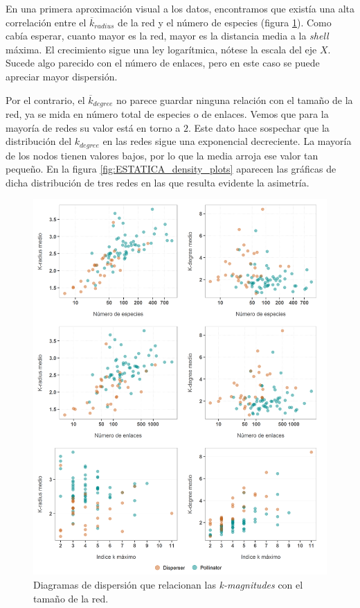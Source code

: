 En una primera aproximación visual a los datos, encontramos que existía una alta correlación entre el $\overline{k}_{radius}$ de la red y el número de especies (figura \ref{fig:ESTATICA_tamanyo_kdegree_kradius}). Como cabía esperar, cuanto mayor es la red, mayor es la distancia media a la \textit{shell} máxima. El crecimiento sigue una ley logarítmica, nótese la escala del eje $X$. Sucede algo parecido con el número de enlaces, pero en este caso se puede apreciar mayor dispersión. 

Por el contrario, el $\overline{k}_{degree}$ no parece guardar ninguna relación con el tamaño de la red, ya se mida en número total de especies o de enlaces. Vemos que para la mayoría de redes su valor está en torno a $2$. Este dato hace sospechar que la distribución del ${k}_{degree}$ en las redes sigue una exponencial decreciente. La mayoría de los nodos tienen valores bajos, por lo que la media arroja ese valor tan pequeño. En la figura \ref{fig:ESTATICA_density_plots} aparecen las gráficas de dicha distribución de tres redes en las que resulta evidente la asimetría. 

\begin{figure}[h!]
\centering
\includegraphics[scale=0.18]{Figures/ESTATICA_tamanyo_kdegree_kradius.png}
\caption{Diagramas de dispersión que relacionan las \textit{k-magnitudes} con el tamaño de la red.}
\label{fig:ESTATICA_tamanyo_kdegree_kradius}
\end{figure}

